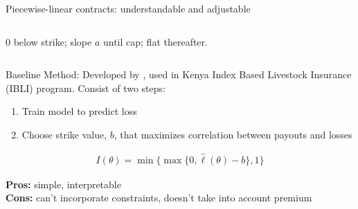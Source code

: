 \documentclass{beamer}
\begin{document}
\begin{frame}{Piecewise-linear contracts: understandable and adjustable}
\begin{columns}[T,onlytextwidth]
{
    }

    {\scriptsize 0 below strike; slope \(a\) until cap; flat thereafter.}
    \end{columns}
    \end{frame}

   \begin{frame}{Baseline Method: \cite{chantarat2013designing}}
    Developed by \cite{chantarat2013designing}, used in Kenya Index Based Livestock Insurance (IBLI) program.  Consist of two steps: 
    \vspace{5mm}
    \begin{enumerate}
        \item Train model to predict loss
        \item Choose strike value, $b$, that maximizes correlation between payouts and losses
    \end{enumerate}

    \begin{align*}
      I(\theta)=\min\{\max\{0, \widehat{\ell}(\theta)-b\},1\}
    \end{align*}

    \vspace{5mm}
    \textbf{Pros:} simple, interpretable \\
    \textbf{Cons:} can't incorporate constraints, doesn't take into account premium 
    
\end{frame}
\end{document}
